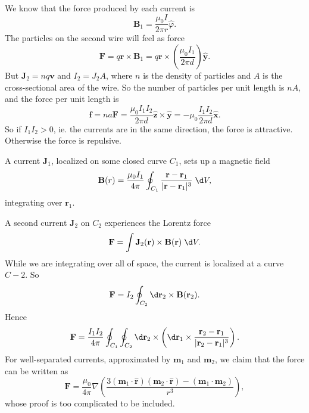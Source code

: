 \documentclass[a4paper]{article}
\begin{document}
\begin{eg}\leavevmode
  \begin{center}
  \end{center}
  We know that the force produced by each current is
  \[
    \mathbf{B}_1 = \frac{\mu_0 I}{2\pi r}\hat{\varphi}.
  \]
  The particles on the second wire will feel as force
  \[
    \mathbf{F} = q\mathbf{r}\times \mathbf{B}_1 = q\mathbf{r}\times \left(\frac{\mu_0 I_1}{2\pi d}\right) \hat{\mathbf{y}}.
  \]
  But $\mathbf{J}_2 = nq\mathbf{v}$ and $I_2 = J_2 A$, where $n$ is the density of particles and $A$ is the cross-sectional area of the wire. So the number of particles per unit length is $nA$, and the force per unit length is
  \[
    \mathbf{f} = na\mathbf{F} = \frac{\mu_0 I_1I_2}{2\pi d}\hat{\mathbf{z}}\times \hat{\mathbf{y}} = -\mu_0\frac{I_1I_2}{2\pi d}\hat{\mathbf{x}}.
  \]
  So if $I_1I_2 > 0$, ie. the currents are in the same direction, the force is attractive. Otherwise the force is repulsive.
\end{eg}

\begin{eg}
  A current $\mathbf{J}_1$, localized on some closed curve $C_1$, sets up a magnetic field
  \[
    \mathbf{B}(r) = \frac{\mu_0I_1}{4\pi}\oint_{C_1} \frac{\mathbf{r} - \mathbf{r}_1}{|\mathbf{r} - \mathbf{r}_1|^3}\;\d V,
  \]
  integrating over $\mathbf{r}_1$.

  A second current $\mathbf{J}_2$ on $C_2$ experiences the Lorentz force
  \[
    \mathbf{F} = \int \mathbf{J}_2(\mathbf{r})\times \mathbf{B}(\mathbf{r})\;\d V.
  \]
  While we are integrating over all of space, the current is localized at a curve $C-2$. So
  \[
    \mathbf{F} = I_2\oint_{C_2} \d \mathbf{r}_2 \times \mathbf{B}(\mathbf{r}_2).
  \]
  Hence
  \[
    \mathbf{F} = \frac{I_1 I_2}{4\pi}\oint_{C_1}\oint_{C_2}\d \mathbf{r}_2\times \left(\d \mathbf{r}_1\times \frac{\mathbf{r}_2 - \mathbf{r}_1}{|\mathbf{r}_2 - \mathbf{r}_1|^3}\right).
  \]
  For well-separated currents, approximated by $\mathbf{m}_1$ and $\mathbf{m}_2$, we claim that the force can be written as
  \[
    \mathbf{F} = \frac{\mu_0}{4\pi}\nabla\left(\frac{3(\mathbf{m}_1\cdot \hat{\mathbf{r}})(\mathbf{m}_2\cdot \hat{\mathbf{r}}) - (\mathbf{m}_1\cdot \mathbf{m}_2)}{r^3}\right),
  \]
  whose proof is too complicated to be included.
\end{eg}
\end{document}
